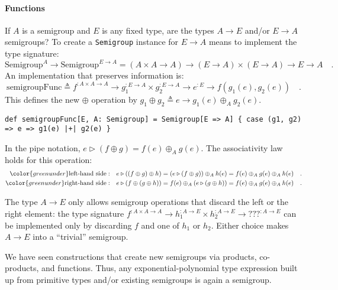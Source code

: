 \paragraph{Functions}

If $A$ is a semigroup and $E$ is any fixed type, are the types $A\rightarrow E$
and/or $E\rightarrow A$ semigroups? To create a \lstinline!Semigroup!
instance for $E\rightarrow A$ means to implement the type signature:
\[
\text{Semigroup}^{A}\rightarrow\text{Semigroup}^{E\rightarrow A}=\left(A\times A\rightarrow A\right)\rightarrow\left(E\rightarrow A\right)\times\left(E\rightarrow A\right)\rightarrow E\rightarrow A\quad.
\]
An implementation that preserves information is:
\[
\text{semigroupFunc}\triangleq f^{:A\times A\rightarrow A}\rightarrow g_{1}^{:E\rightarrow A}\times g_{2}^{:E\rightarrow A}\rightarrow e^{:E}\rightarrow f(g_{1}(e),g_{2}(e))\quad.
\]
This defines the new $\oplus$ operation by $g_{1}\oplus g_{2}\triangleq e\rightarrow g_{1}(e)\oplus_{A}g_{2}(e)$.
\begin{lstlisting}
def semigroupFunc[E, A: Semigroup] = Semigroup[E => A] { case (g1, g2) => e => g1(e) |+| g2(e) }
\end{lstlisting}

In the pipe notation, $e\triangleright(f\oplus g)=f(e)\oplus_{A}g(e)$.
The associativity law holds for this operation:
\begin{align*}
{\color{greenunder}\text{left-hand side}:}\quad & e\triangleright\left(\left(f\oplus g\right)\oplus h\right)=\left(e\triangleright(f\oplus g)\right)\oplus_{A}h(e)=f(e)\oplus_{A}g(e)\oplus_{A}h(e)\quad.\\
{\color{greenunder}\text{right-hand side}:}\quad & e\triangleright\left(f\oplus\left(g\oplus h\right)\right)=f(e)\oplus_{A}\left(e\triangleright(g\oplus h)\right)=f(e)\oplus_{A}g(e)\oplus_{A}h(e)\quad.
\end{align*}

The type $A\rightarrow E$ only allows semigroup operations that discard
the left or the right element: the type signature $f^{:A\times A\rightarrow A}\rightarrow h_{1}^{:A\rightarrow E}\times h_{2}^{:A\rightarrow E}\rightarrow\text{???}^{:A\rightarrow E}$
can be implemented only by discarding $f$ and one of $h_{1}$ or
$h_{2}$. Either choice makes $A\rightarrow E$ into a \textsf{``}trivial\textsf{''}
semigroup.

We have seen constructions that create new semigroups via products,
co-products, and functions. Thus, any exponential-polynomial type
expression built up from primitive types and/or existing semigroups
is again a semigroup.

